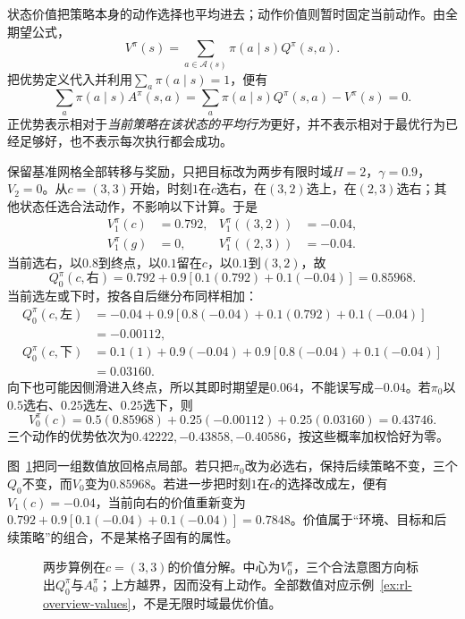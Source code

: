 状态价值把策略本身的动作选择也平均进去；动作价值则暂时固定当前动作。由全期望公式，
\begin{equation}
  V^\pi(s)=\sum_{a\in\mathcal A(s)}\pi(a\mid s)Q^\pi(s,a).
  \label{eq:rl-overview-vq}
\end{equation}
把优势定义代入并利用$\sum_a\pi(a\mid s)=1$，便有
\[
  \sum_a\pi(a\mid s)A^\pi(s,a)
  =\sum_a\pi(a\mid s)Q^\pi(s,a)-V^\pi(s)=0.
\]
正优势表示相对于\emph{当前策略在该状态的平均行为}更好，并不表示相对于最优行为已经足够好，也不表示每次执行都会成功。

\begin{example}[随机网格中的两步价值]
  \label{ex:rl-overview-values}
  保留基准网格全部转移与奖励，只把目标改为两步有限时域$H=2$，$\gamma=0.9$，$V_2=0$。从$c=(3,3)$开始，时刻$1$在$c$选右，在$(3,2)$选上，在$(2,3)$选右；其他状态任选合法动作，不影响以下计算。于是
  \[
  \begin{aligned}
    V_1^\pi(c)&=0.792,& V_1^\pi((3,2))&=-0.04,\\
    V_1^\pi(g)&=0,& V_1^\pi((2,3))&=-0.04.
  \end{aligned}
  \]
  当前选右，以$0.8$到终点，以$0.1$留在$c$，以$0.1$到$(3,2)$，故
  \[
    Q_0^\pi(c,\text{右})
     =0.792+0.9[0.1(0.792)+0.1(-0.04)]=0.85968.
  \]
  当前选左或下时，按各自后继分布同样相加：
  \[
  \begin{aligned}
    Q_0^\pi(c,\text{左})
      &=-0.04+0.9[0.8(-0.04)+0.1(0.792)+0.1(-0.04)]\\
      &=-0.00112,\\
    Q_0^\pi(c,\text{下})
      &=0.1(1)+0.9(-0.04)+0.9[0.8(-0.04)+0.1(-0.04)]\\
      &=0.03160.
  \end{aligned}
  \]
  向下也可能因侧滑进入终点，所以其即时期望是$0.064$，不能误写成$-0.04$。若$\pi_0$以$0.5$选右、$0.25$选左、$0.25$选下，则
  \[
    V_0^\pi(c)=0.5(0.85968)+0.25(-0.00112)+0.25(0.03160)
              =0.43746.
  \]
  三个动作的优势依次为$0.42222,-0.43858,-0.40586$，按这些概率加权恰好为零。
\end{example}

图~\ref{fig:rl-overview-values}把同一组数值放回格点局部。若只把$\pi_0$改为必选右，保持后续策略不变，三个$Q_0$不变，而$V_0$变为$0.85968$。若进一步把时刻$1$在$c$的选择改成左，便有$V_1(c)=-0.04$，当前向右的价值重新变为$0.792+0.9[0.1(-0.04)+0.1(-0.04)]=0.7848$。价值属于“环境、目标和后续策略”的组合，不是某格子固有的属性。

\begin{figure}[htbp]
  \centering
  
  \caption{两步算例在$c=(3,3)$的价值分解。中心为$V_0^\pi$，三个合法意图方向标出$Q_0^\pi$与$A_0^\pi$；上方越界，因而没有上动作。全部数值对应示例~\ref{ex:rl-overview-values}，不是无限时域最优价值。}
  \label{fig:rl-overview-values}
\end{figure}

